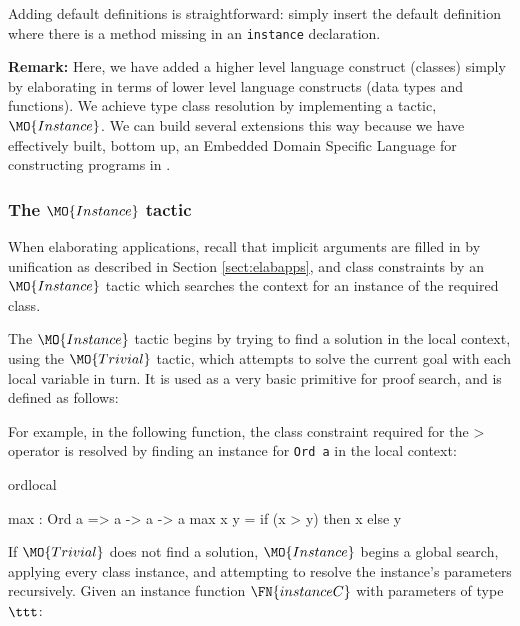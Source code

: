 Adding default definitions is straightforward: simply insert the default definition where
there is a method missing in an \texttt{instance} declaration.

\textbf{Remark:} Here, we have added a higher level language construct
(classes) simply by elaborating in terms of lower level language constructs
(data types and functions).  We achieve type class resolution by implementing a
tactic, $\MO{Instance}$.  We can build several extensions this way because we
have effectively built, bottom up, an Embedded Domain Specific Language for
constructing programs in \TT{}.

\subsubsection{The $\MO{Instance}$ tactic}

\label{sect:instance}

When elaborating applications, recall that implicit arguments are filled in by
unification as described in Section \ref{sect:elabapps}, and class
constraints by an $\MO{Instance}$ tactic which searches the context for an
instance of the required class. 

The $\MO{Instance}$ tactic begins by trying to find a solution in the local context,
using the $\MO{Trivial}$ tactic, which attempts
to solve the current goal with each local variable in turn. It is used as a very
basic primitive for proof search, and is defined as follows:


For example, in the following function, the class constraint required for
the $\texttt{>}$ operator is resolved by finding an instance for \texttt{Ord a}
in the local context:

\begin{SaveVerbatim}{ordlocal}

max : Ord a => a -> a -> a
max x y = if (x > y) then x else y

\end{SaveVerbatim}

If $\MO{Trivial}$ does not find a solution, $\MO{Instance}$ begins a global search,
applying every class instance, and attempting to resolve the instance's parameters
recursively. Given an instance function $\FN{instanceC}$ with parameters
of type $\ttt$:

